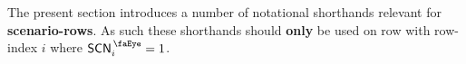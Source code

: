 The present section introduces a number of notational shorthands relevant for \textbf{scenario-rows}.
As such these shorthands should \textbf{only} be used on row with row-index $i$ where $\peekScenario_{i} = 1$.
